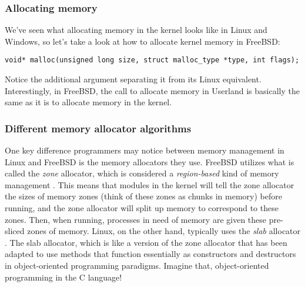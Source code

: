 \documentclass[letterpaper,10pt,draftclsnofoot,onecolumn,titlepage]{IEEEtran}
\begin{document}
\subsubsection{Allocating memory}
We've seen what allocating memory in the kernel looks like in Linux and Windows, so let's take a look at how to allocate kernel memory in FreeBSD: \cite{freeBSD2}
\begin{lstlisting}
void* malloc(unsigned long size, struct malloc_type *type, int flags);
\end{lstlisting}
Notice the additional argument separating it from its Linux equivalent. Interestingly, in FreeBSD, the call to allocate memory in Userland is basically the same as it is to allocate memory in the kernel. 
\subsubsection{Different memory allocator algorithms}
One key difference programmers may notice between memory management in Linux and FreeBSD is the memory allocators they use. FreeBSD utilizes what is called the \emph{zone} allocator, which is considered a \emph{region-based} kind of memory management \cite{freeBSD3}. This means that modules in the kernel will tell the zone allocator the sizes of memory zones (think of these zones as chunks in memory) before running, and the zone allocator will split up memory to correspond to these zones. Then, when running, processes in need of memory are given these pre-sliced zones of memory. Linux, on the other hand, typically uses the \emph{slab} allocator \cite{linux2}. The slab allocator, which is like a version of the zone allocator that has been adapted to use methods that function essentially as constructors and destructors in object-oriented programming paradigms. Imagine that, object-oriented programming in the C language! 
\newpage


\end{document}
